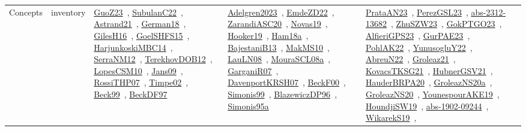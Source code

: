 {\begin{longtable}{lp{3cm}>{\raggedright\arraybackslash}p{6cm}>{\raggedright\arraybackslash}p{6cm}>{\raggedright\arraybackslash}p{8cm}}
Concepts & inventory & \href{../works/GuoZ23.pdf}{GuoZ23}~\cite{GuoZ23}, \href{../works/SubulanC22.pdf}{SubulanC22}~\cite{SubulanC22}, \href{../works/Astrand21.pdf}{Astrand21}~\cite{Astrand21}, \href{../works/German18.pdf}{German18}~\cite{German18}, \href{../works/GilesH16.pdf}{GilesH16}~\cite{GilesH16}, \href{../works/GoelSHFS15.pdf}{GoelSHFS15}~\cite{GoelSHFS15}, \href{../works/HarjunkoskiMBC14.pdf}{HarjunkoskiMBC14}~\cite{HarjunkoskiMBC14}, \href{../works/SerraNM12.pdf}{SerraNM12}~\cite{SerraNM12}, \href{../works/TerekhovDOB12.pdf}{TerekhovDOB12}~\cite{TerekhovDOB12}, \href{../works/LopesCSM10.pdf}{LopesCSM10}~\cite{LopesCSM10}, \href{../works/Jans09.pdf}{Jans09}~\cite{Jans09}, \href{../works/RossiTHP07.pdf}{RossiTHP07}~\cite{RossiTHP07}, \href{../works/Timpe02.pdf}{Timpe02}~\cite{Timpe02}, \href{../works/Beck99.pdf}{Beck99}~\cite{Beck99}, \href{../works/BeckDF97.pdf}{BeckDF97}~\cite{BeckDF97} & \href{../works/Adelgren2023.pdf}{Adelgren2023}~\cite{Adelgren2023}, \href{../works/EmdeZD22.pdf}{EmdeZD22}~\cite{EmdeZD22}, \href{../works/ZarandiASC20.pdf}{ZarandiASC20}~\cite{ZarandiASC20}, \href{../works/Novas19.pdf}{Novas19}~\cite{Novas19}, \href{../works/Hooker19.pdf}{Hooker19}~\cite{Hooker19}, \href{../works/Ham18a.pdf}{Ham18a}~\cite{Ham18a}, \href{../works/BajestaniB13.pdf}{BajestaniB13}~\cite{BajestaniB13}, \href{../works/MakMS10.pdf}{MakMS10}~\cite{MakMS10}, \href{../works/LauLN08.pdf}{LauLN08}~\cite{LauLN08}, \href{../works/MouraSCL08a.pdf}{MouraSCL08a}~\cite{MouraSCL08a}, \href{../works/GarganiR07.pdf}{GarganiR07}~\cite{GarganiR07}, \href{../works/DavenportKRSH07.pdf}{DavenportKRSH07}~\cite{DavenportKRSH07}, \href{../works/BeckF00.pdf}{BeckF00}~\cite{BeckF00}, \href{../works/Simonis99.pdf}{Simonis99}~\cite{Simonis99}, \href{../works/BlazewiczDP96.pdf}{BlazewiczDP96}~\cite{BlazewiczDP96}, \href{../works/Simonis95a.pdf}{Simonis95a}~\cite{Simonis95a} & \href{../works/PrataAN23.pdf}{PrataAN23}~\cite{PrataAN23}, \href{../works/PerezGSL23.pdf}{PerezGSL23}~\cite{PerezGSL23}, \href{../works/abs-2312-13682.pdf}{abs-2312-13682}~\cite{abs-2312-13682}, \href{../works/ZhuSZW23.pdf}{ZhuSZW23}~\cite{ZhuSZW23}, \href{../works/GokPTGO23.pdf}{GokPTGO23}~\cite{GokPTGO23}, \href{../works/AlfieriGPS23.pdf}{AlfieriGPS23}~\cite{AlfieriGPS23}, \href{../works/GurPAE23.pdf}{GurPAE23}~\cite{GurPAE23}, \href{../works/PohlAK22.pdf}{PohlAK22}~\cite{PohlAK22}, \href{../works/YunusogluY22.pdf}{YunusogluY22}~\cite{YunusogluY22}, \href{../works/AbreuN22.pdf}{AbreuN22}~\cite{AbreuN22}, \href{../works/Groleaz21.pdf}{Groleaz21}~\cite{Groleaz21}, \href{../works/KovacsTKSG21.pdf}{KovacsTKSG21}~\cite{KovacsTKSG21}, \href{../works/HubnerGSV21.pdf}{HubnerGSV21}~\cite{HubnerGSV21}, \href{../works/HauderBRPA20.pdf}{HauderBRPA20}~\cite{HauderBRPA20}, \href{../works/GroleazNS20a.pdf}{GroleazNS20a}~\cite{GroleazNS20a}, \href{../works/GroleazNS20.pdf}{GroleazNS20}~\cite{GroleazNS20}, \href{../works/YounespourAKE19.pdf}{YounespourAKE19}~\cite{YounespourAKE19}, \href{../works/HoundjiSW19.pdf}{HoundjiSW19}~\cite{HoundjiSW19}, \href{../works/abs-1902-09244.pdf}{abs-1902-09244}~\cite{abs-1902-09244}, \href{../works/WikarekS19.pdf}{WikarekS19}~\cite{WikarekS19}, 
\end{longtable}}
